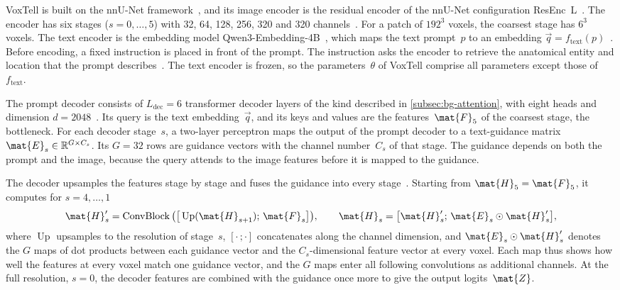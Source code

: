 VoxTell is built on the nnU-Net framework~\cite[Suppl.~Sec.~A]{rokuss2025voxtellfreetextpromptableuniversal}, and its image encoder is the residual encoder of the nnU-Net configuration ResEnc~L~\cite[Sec.~3.1]{isensee2024nnunetrevisited}.
The encoder has six stages ($s = 0, \dots, 5$) with 32, 64, 128, 256, 320 and 320 channels~\cite[Suppl.~Sec.~A.2]{rokuss2025voxtellfreetextpromptableuniversal}.
For a patch of $192^3$ voxels, the coarsest stage has $6^3$ voxels.
The text encoder is the embedding model Qwen3-Embedding-4B~\cite{zhang2025qwen3embedding}, which maps the text prompt~$p$ to an embedding $\vec{q} = f_{\mathrm{text}}(p)$~\cite[Eq.~2]{rokuss2025voxtellfreetextpromptableuniversal}.
Before encoding, a fixed instruction is placed in front of the prompt.
The instruction asks the encoder to retrieve the anatomical entity and location that the prompt describes~\cite[Suppl.~Sec.~A.2]{rokuss2025voxtellfreetextpromptableuniversal}.
The text encoder is frozen, so the parameters~$\theta$ of VoxTell comprise all parameters except those of~$f_{\mathrm{text}}$.

The prompt decoder consists of $L_{\mathrm{dec}} = 6$ transformer decoder layers of the kind described in \cref{subsec:bg-attention}, with eight heads and dimension $d = 2048$~\cite[Sec.~3, Eq.~3, Suppl.~Sec.~A.2]{rokuss2025voxtellfreetextpromptableuniversal}.
Its query is the text embedding~$\vec{q}$, and its keys and values are the features~$\mat{F}_5$ of the coarsest stage, the bottleneck.
For each decoder stage~$s$, a two-layer perceptron maps the output of the prompt decoder to a text-guidance matrix $\mat{E}_s \in \mathbb{R}^{G \times C_s}$.
Its $G = 32$ rows are guidance vectors with the channel number~$C_s$ of that stage.
The guidance depends on both the prompt and the image, because the query attends to the image features before it is mapped to the guidance.

The decoder upsamples the features stage by stage and fuses the guidance into every stage~\cite[Eqs.~4--6]{rokuss2025voxtellfreetextpromptableuniversal}.
Starting from $\mat{H}_5 = \mat{F}_5$, it computes for $s = 4, \dots, 1$
\begin{equation}
\mat{H}'_s = \operatorname{ConvBlock}\big(\big[\operatorname{Up}(\mat{H}_{s+1});\, \mat{F}_s\big]\big),
\qquad
\mat{H}_s = \big[\mat{H}'_s;\, \mat{E}_s \odot \mat{H}'_s\big],
\label{eq:bg-voxtell-fusion}
\end{equation}
where $\operatorname{Up}$ upsamples to the resolution of stage~$s$, $[\cdot\,;\cdot]$ concatenates along the channel dimension, and $\mat{E}_s \odot \mat{H}'_s$ denotes the $G$ maps of dot products between each guidance vector and the $C_s$-dimensional feature vector at every voxel.
Each map thus shows how well the features at every voxel match one guidance vector, and the $G$ maps enter all following convolutions as additional channels.
At the full resolution, $s = 0$, the decoder features are combined with the guidance once more to give the output logits~$\mat{Z}$.

